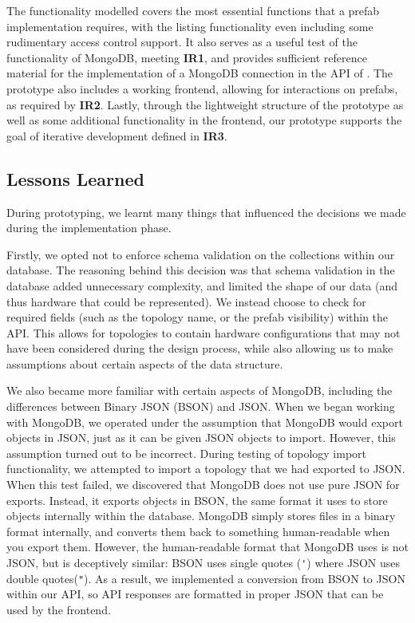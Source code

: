 \documentclass[11pt]{article}
\begin{document}
		The functionality modelled covers the most essential functions that a prefab implementation requires, with the listing functionality even including some rudimentary access control support.
		It also serves as a useful test of the functionality of MongoDB, meeting \textbf{IR1}, and provides sufficient reference material for the implementation of a MongoDB connection in the API of \opendc{}.
		The prototype also includes a working frontend, allowing for interactions on prefabs, as required by \textbf{IR2}.
		Lastly, through the lightweight structure of the prototype as well as some additional functionality in the frontend, our prototype supports the goal of iterative development defined in \textbf{IR3}.

	\subsection{Lessons Learned}
		During prototyping, we learnt many things that influenced the decisions we made during the implementation phase.

		Firstly, we opted not to enforce schema validation on the collections within our database.
		The reasoning behind this decision was that schema validation in the database added unnecessary complexity, and limited the shape of our data (and thus hardware that could be represented).
		We instead choose to check for required fields (such as the topology name, or the prefab visibility) within the API.
		This allows for topologies to contain hardware configurations that may not have been considered during the design process, while also allowing us to make assumptions about certain aspects of the data structure.

		We also became more familiar with certain aspects of MongoDB, including the differences between Binary JSON (BSON) and JSON.
		When we began working with MongoDB, we operated under the assumption that MongoDB would export objects in JSON, just as it can be given JSON objects to import.
		However, this assumption turned out to be incorrect. 
		During testing of topology import functionality, we attempted to import a topology that we had exported to JSON.
		When this test failed, we discovered that MongoDB does not use pure JSON for exports.
		Instead, it exports objects in BSON, the same format it uses to store objects internally within the database.
		MongoDB simply stores files in a binary format internally, and converts them back to something human-readable when you export them. 
		However, the human-readable format that MongoDB uses is not JSON, but is deceptively similar: BSON uses single quotes (\verb|'|) where JSON uses double quotes(\verb|"|).
		As a result, we implemented a conversion from BSON to JSON within our API, so API responses are formatted in proper JSON that can be used by the frontend.
		
\end{document}
